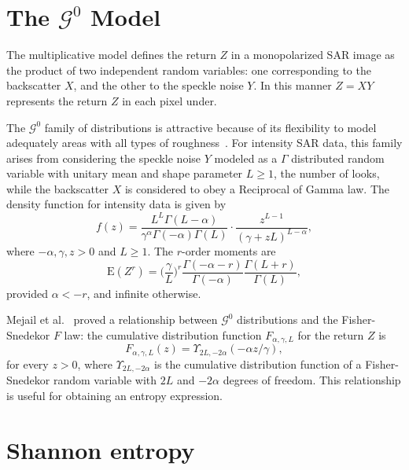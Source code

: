 \documentclass[journal]{IEEEtran}
\begin{document}
	\section{The $\mathcal{G}^0$ Model}
	\label{sec_SAR}
	
	The multiplicative model defines the return $Z$ in a monopolarized SAR image as the product of two independent random variables: one corresponding to the backscatter $X$, and the other to the speckle noise $Y$.
	In this manner $Z=X Y$ represents the return $Z$ in each pixel under.
	
	The $\mathcal{G}^{0}$ family of distributions is attractive because of its flexibility to model adequately areas with all types of roughness~\cite{MejailJacoboFreryBustos:IJRS,mejailfreryjacobobustos2001}. 
	For intensity SAR data, this family arises from considering the speckle noise $Y$ modeled as a $\Gamma$ distributed random variable with unitary mean and shape parameter $L\geq1$, the number of looks, while the backscatter $X$ is considered to obey a Reciprocal of Gamma law.  
	The density function for intensity data is given by
	\begin{equation}
		f(z) =\frac{L^{L}\Gamma ( L-\alpha
			) }{\gamma ^{\alpha }\Gamma ( -\alpha ) \Gamma (
			L) }\cdot  
		\frac{z^{L-1}}{( \gamma +zL) ^{L-\alpha }},%
		\label{}
	\end{equation}
	where $-\alpha,\gamma ,z>0$ and $L\geq 1$. 
	The $r$-order moments are
	\begin{equation}
		\text{E}(Z^r) =\Big(\frac{\gamma}{L}\Big)^r\frac{\Gamma ( -\alpha-r )}{ \Gamma (-\alpha) }
		\frac{\Gamma (L+r )}{\Gamma (L)},
		\label{moments_gI0}
	\end{equation}
	provided $\alpha<-r$, and infinite otherwise.
	
	Mejail et al.~\cite{MejailJacoboFreryBustos:IJRS} proved a relationship between $\mathcal G^0$ distributions and the Fisher-Snedekor $F$ law:
	the cumulative distribution function $F_{\alpha,\gamma,L}$ for the return $Z$ is
	\begin{equation}
		F_{\alpha,\gamma,L}(z) = \Upsilon_{2L, -2\alpha}(-\alpha  z / \gamma),
		\label{eq:CDFG0}
	\end{equation}
	for every $z>0$, where $\Upsilon_{2L, -2\alpha}$ is the cumulative distribution function of a Fisher-Snedekor random variable with $2L$ and $-2\alpha$ degrees of freedom.
	This relationship is useful for obtaining an entropy expression. 
	
	\section{Shannon entropy}
	
\end{document}
